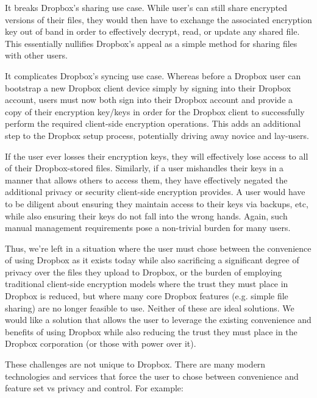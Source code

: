 \begin{packed_enum}
\item It breaks Dropbox's sharing use case. While user's can still
  share encrypted versions of their files, they would then have to
  exchange the associated encryption key out of band in order to
  effectively decrypt, read, or update any shared file. This
  essentially nullifies Dropbox's appeal as a simple method for
  sharing files with other users.
\item It complicates Dropbox's syncing use case. Whereas before a
  Dropbox user can bootstrap a new Dropbox client device simply by
  signing into their Dropbox account, users must now both sign into
  their Dropbox account and provide a copy of their encryption
  key/keys in order for the Dropbox client to successfully perform the
  required client-side encryption operations. This adds an additional
  step to the Dropbox setup process, potentially driving away novice
  and lay-users.
\item If the user ever losses their encryption keys, they will
  effectively lose access to all of their Dropbox-stored
  files. Similarly, if a user mishandles their keys in a manner that
  allows others to access them, they have effectively negated the
  additional privacy or security client-side encryption provides. A
  user would have to be diligent about ensuring they maintain access
  to their keys via backups, etc, while also ensuring their keys do
  not fall into the wrong hands. Again, such manual management
  requirements pose a non-trivial burden for many users.
\end{packed_enum}

Thus, we're left in a situation where the user must chose between the
convenience of using Dropbox as it exists today while also sacrificing
a significant degree of privacy over the files they upload to Dropbox,
or the burden of employing traditional client-side encryption models
where the trust they must place in Dropbox is reduced, but where many
core Dropbox features (e.g. simple file sharing) are no longer
feasible to use. Neither of these are ideal solutions. We would like a
solution that allows the user to leverage the existing convenience and
benefits of using Dropbox while also reducing the trust they must
place in the Dropbox corporation (or those with power over it).

These challenges are not unique to Dropbox. There are many modern
technologies and services that force the user to chose between
convenience and feature set vs privacy and control. For example:

